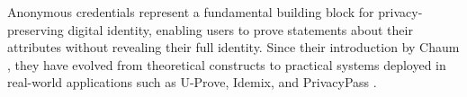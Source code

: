 


Anonymous credentials represent a fundamental building block for privacy-preserving digital identity, enabling users to prove statements about their attributes without revealing their full identity. Since their introduction by Chaum \cite{chaum_untraceable_1981}, they have evolved from theoretical constructs to practical systems deployed in real-world applications such as U-Prove, Idemix, and PrivacyPass \cite{paquin2011u, camenisch_design_2002, davidson2018privacy}.

